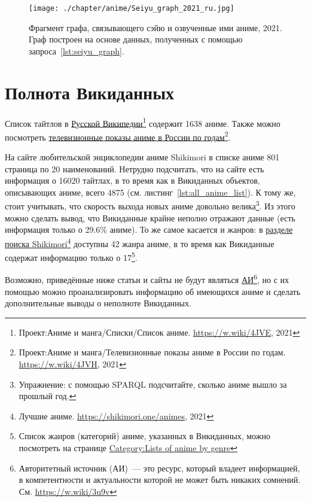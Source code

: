 \newpage
{}
\begin{fullwidth}
\begin{figure*}[h]
	\texttt{[image: ./chapter/anime/Seiyu\_graph\_2021\_ru.jpg]}
	\caption[Граф сэйю и аниме, 2021.]{Фрагмент графа, связывающего сэйю и озвученные ими аниме, 2021. Граф построен на основе данных, полученных с помощью запроса~\protect\ref{lst:seiyu_graph}.}%
      \label{fig:Seiyu_graph_2021_ru}%
\end{figure*} 
\end{fullwidth}

\section{Полнота Викиданных}

Список тайтлов в \href{https://w.wiki/4JVE}{Русской Википедии}\footnote{Проект:Аниме и манга/Списки/Список аниме. \href{https://w.wiki/4JVE}{https://w.wiki/4JVE}, 2021} содержит \num{1638} аниме. Также можно посмотреть \href{https://w.wiki/4JVH}{телевизионные показы аниме в России по годам}\footnote{Проект:Аниме и манга/Телевизионные показы аниме в России по годам. \href{https://w.wiki/4JVH}{https://w.wiki/4JVH}, 2021}.

На сайте любительской энциклопедии аниме Shikimori\autocite{shikimori} в списке аниме \num{801} страница по \num{20} наименований. Нетрудно подсчитать, что на сайте есть информация о \num{16020} тайтлах, в то время как в Викиданных объектов, описывающих аниме, всего \num{4875} (см. листинг~\ref{lst:all_anime_list}). К тому же, стоит учитывать, что скорость выхода новых аниме довольно велика\footnote{Упражнение: с помощью SPARQL подсчитайте, сколько аниме вышло за прошлый год.}. Из этого можно сделать вывод, что Викиданные крайне неполно отражают данные (есть информация только о \num{29.6}\% аниме). То же самое касается и жанров: в \href{https://shikimori.one/animes}{разделе поиска Shikimori}\footnote{Лучшие аниме. \href{https://shikimori.one/animes}{https://shikimori.one/animes}, 2021} доступны \num{42} жанра аниме, в то время как Викиданные содержат информацию только о \num{17}\footnote{Список жанров (категорий) аниме, указанных в Викиданных, можно посмотреть на странице \href{https://en.wikipedia.org/wiki/Category:Lists\_of_anime\_by\_genre}{Category:Lists of anime by genre}}.

Возможно, приведённые ниже статьи и сайты не будут являться \href{https://w.wiki/3u9v}{АИ}\footnote{Авторитетный источник (АИ)~--- это ресурс, который владеет информацией, в компетентности и актуальности которой не может быть никаких сомнений. См. \href{https://w.wiki/3u9v}{https://w.wiki/3u9v}}, но с их помощью можно проанализировать информацию об имеющихся аниме и сделать дополнительные выводы о неполноте Викиданных.

